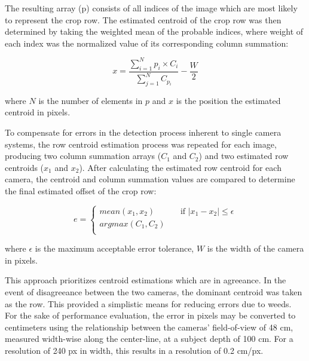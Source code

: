 \documentclass[authoryear]{elsarticle}
\begin{document}
The resulting array (p) consists of all indices of the image which are most
likely to represent the crop row. The estimated centroid of the crop
row was then determined by taking the weighted mean of the probable
indices, where weight of each index was the normalized value of its
corresponding column summation:

\begin{equation}
    x = \frac{\displaystyle\sum_{i=1}^{N} p_{i} \times
      C_{i}}{\displaystyle\sum_{j=1}^{N} C_{p_{i}}} - \frac{W}{2}
  \label{eq:centroid}
\end{equation}
\begin{flushleft}
where $N$ is the number of elements in $p$ and $x$ is the position the
estimated centroid in pixels.
\end{flushleft}

To compensate for errors in the detection process inherent to single
camera systems, the row centroid estimation process was repeated for
each image, producing two column summation arrays ($C_{1}$ and $C_{2}$) and two
estimated row centroids ($x_{1}$ and $x_{2}$). After calculating the estimated
row centroid for each camera, the centroid and column summation values
are compared to determine the final estimated offset of the crop row:

\begin{equation}
  e = 
  \begin{cases}
    mean(x_{1},x_{2})  & \quad \text{if } |x_{1}-x_{2}| \leq  \epsilon\\
    argmax(C_{1},C_{2})  & \quad  \\
  \end{cases}
  \label{eq:camera_selection}
\end{equation}
\begin{flushleft}
where $\epsilon$ is the maximum acceptable error tolerance, $W$ is the width of
the camera in pixels. 
\end{flushleft}

This approach prioritizes centroid estimations which are in
agreeance. In the event of disagreeance between the two cameras, the dominant
centroid was taken as the row. This provided a simplistic means for
reducing errors due to weeds. For the sake of performance evaluation,
the error in pixels may be converted to centimeters using the
relationship between the cameras’ field-of-view of 48 cm, measured
width-wise along the center-line, at a subject depth of 100 cm. For a
resolution of 240 px in width, this results in a resolution of 0.2 cm/px.
\end{document}
